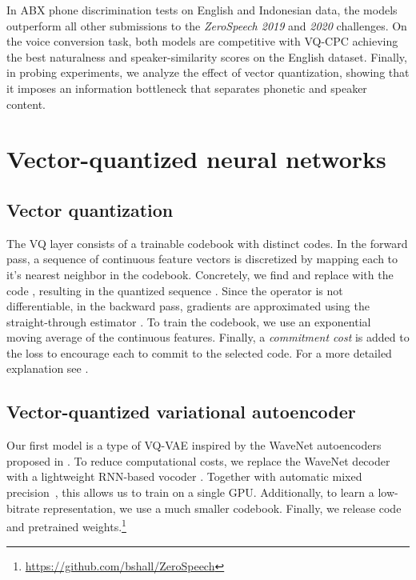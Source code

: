 \documentclass[a4paper]{article}
\begin{document}
In ABX phone discrimination tests on English and Indonesian data, the models outperform all other submissions to the \textit{ZeroSpeech 2019} and \textit{2020} challenges.
On the voice conversion task, both models are competitive with VQ-CPC achieving the best naturalness and speaker-similarity scores on the English dataset.
Finally, in probing experiments, we analyze the effect of vector quantization, showing that it imposes an information bottleneck that separates phonetic and speaker content.


%
 \section{Vector-quantized neural networks}



\subsection{Vector quantization}
\label{sec:vq-layer}

The VQ layer consists of a trainable codebook  with  distinct codes. 
In the forward pass, a sequence of continuous feature vectors  is discretized by mapping each  to it's nearest neighbor in the codebook. 
Concretely, we find  and replace  with the code , resulting in the quantized sequence . 
Since the  operator is not differentiable, in the backward pass, gradients are approximated using the straight-through estimator \cite{bengio+etal_arxiv13}. 
To train the codebook, we use an exponential moving average of the continuous features. Finally, a \textit{commitment cost} is added to the loss to encourage each  to commit to the selected code. 
For a more detailed explanation see \cite{vandenoord+etal_neurips17}.

\subsection{Vector-quantized variational autoencoder}
\label{sec:vqvae}

Our first model is a type of VQ-VAE inspired by the WaveNet autoencoders proposed in \cite{chorowski+etal_taslp19}. To reduce computational costs, we replace the WaveNet decoder~\cite{vandenoord+etal_arxiv16} with a lightweight RNN-based vocoder \cite{lorenzotrueb+etal_interspeech19}.
Together with automatic mixed precision~\cite{micikevicius+etal_iclr18}, this allows us to train on a single GPU.
Additionally, to learn a low-bitrate representation, we use a much smaller codebook.
Finally, we release code and pretrained weights.\footnote{\scriptsize \url{https://github.com/bshall/ZeroSpeech}}
\end{document}

